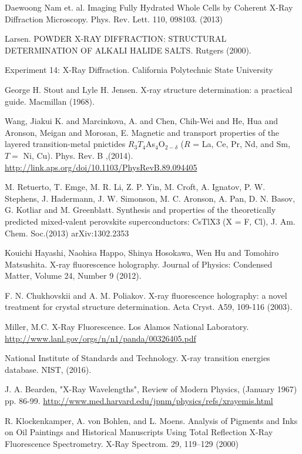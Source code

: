 \documentclass[%
 reprint,
 amsmath,amssymb,
 aps,
 pra,
]{revtex4-1}
\begin{document}
\begin{thebibliography}{6}
	 Daewoong Nam et. al. Imaging Fully Hydrated Whole Cells by Coherent X-Ray Diffraction Microscopy. Phys. Rev. Lett. 110, 098103. (2013)
	 
	 Larsen. POWDER X-RAY DIFFRACTION: STRUCTURAL DETERMINATION OF ALKALI HALIDE SALTS. Rutgers (2000).
	 
	 Experiment 14: X-Ray Diffraction. California Polytechnic State University 
	 
	 George H. Stout and Lyle H. Jensen. X-ray structure determination: a practical guide. Macmillan (1968).
	 
	 Wang, Jiakui K. and Marcinkova, A. and Chen, Chih-Wei and He, Hua and Aronson, Meigan and Morosan, E. Magnetic and transport properties of the layered transition-metal pnictides ${R}_{3}{T}_{4}$As${}_{4}$O${}_{2\ensuremath{-}\ensuremath{\delta}}$ ($R$ = La, Ce, Pr, Nd, and Sm, $T=$ Ni, Cu). Phys. Rev. B ,(2014). \url{http://link.aps.org/doi/10.1103/PhysRevB.89.094405}
	 
	 M. Retuerto, T. Emge, M. R. Li, Z. P. Yin, M. Croft, A. Ignatov, P. W. Stephens, J. Hadermann, J. W. Simonson, M. C. Aronson, A. Pan, D. N. Basov, G. Kotliar and M. Greenblatt. Synthesis and properties of the theoretically predicted mixed-valent perovskite superconductors: CsTlX3 (X = F, Cl),  J. Am. Chem. Soc.(2013) arXiv:1302.2353	 
	 
	 Kouichi Hayashi, Naohisa Happo, Shinya Hosokawa, Wen Hu and Tomohiro Matsushita. X-ray fluorescence holography. Journal of Physics: Condensed Matter, Volume 24, Number 9 (2012).
	 
	 F. N. Chukhovskii and A. M. Poliakov. X-ray fluorescence holography: a novel treatment for crystal structure determination. Acta Cryst. A59, 109-116 (2003).
	 
	 Miller, M.C. X-Ray Fluorescence. Los Alamos National Laboratory. \url{http://www.lanl.gov/orgs/n/n1/panda/00326405.pdf}
	 
	 National Institute of Standards and Technology. X-ray transition energies database. NIST, (2016).
	 
	 J. A. Bearden, "X-Ray Wavelengths", Review of Modern Physics, (January 1967) pp. 86-99. \url{http://www.med.harvard.edu/jpnm/physics/refs/xrayemis.html}

	R. Klockenkamper, A. von Bohlen, and L. Moens. Analysis of Pigments and Inks on Oil Paintings and Historical Manuscripts Using Total Reflection X-Ray Fluorescence Spectrometry. X-Ray Spectrom. 29, 119–129 (2000)
	

\end{thebibliography}
\end{document}
